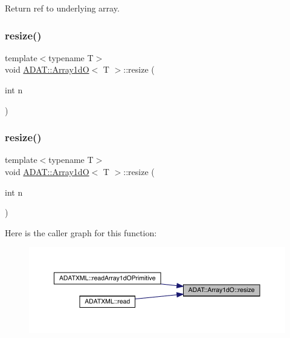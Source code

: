 Return ref to underlying array. 

\mbox{\label{classADAT_1_1Array1dO_afc98b7076e43428faae90d7cb1dab3bf}} 
\subsubsection{\texorpdfstring{resize()}{resize()}\hspace{0.1cm}{\footnotesize\ttfamily [1/2]}}
{\footnotesize\ttfamily template$<$typename T$>$ \\
void \mbox{\hyperlink{classADAT_1_1Array1dO}{A\+D\+A\+T\+::\+Array1dO}}$<$ T $>$\+::resize (\begin{DoxyParamCaption}\item[{int}]{n }\end{DoxyParamCaption})\hspace{0.3cm}{\ttfamily [inline]}}

\mbox{\label{classADAT_1_1Array1dO_afc98b7076e43428faae90d7cb1dab3bf}} 
\subsubsection{\texorpdfstring{resize()}{resize()}\hspace{0.1cm}{\footnotesize\ttfamily [2/2]}}
{\footnotesize\ttfamily template$<$typename T$>$ \\
void \mbox{\hyperlink{classADAT_1_1Array1dO}{A\+D\+A\+T\+::\+Array1dO}}$<$ T $>$\+::resize (\begin{DoxyParamCaption}\item[{int}]{n }\end{DoxyParamCaption})\hspace{0.3cm}{\ttfamily [inline]}}

Here is the caller graph for this function\+:\nopagebreak
\begin{figure}[H]
\begin{center}
\leavevmode
\includegraphics[width=350pt]{db/d5c/classADAT_1_1Array1dO_afc98b7076e43428faae90d7cb1dab3bf_icgraph}
\end{center}
\end{figure}
\mbox{\label{classADAT_1_1Array1dO_a749307d8e42867d6fac39dc9aca84978}} 
